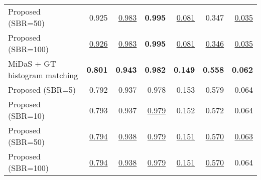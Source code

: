 \begin{tabular}{lrrr|rrr}
Proposed (SBR=50)                  &               0.925 &   \underline{0.983} &      \textbf{0.995} &  \underline{0.081} &              0.347 &  \underline{0.035} \\
Proposed (SBR=100)                 &   \underline{0.926} &   \underline{0.983} &      \textbf{0.995} &  \underline{0.081} &  \underline{0.346} &  \underline{0.035} \\
\midrule
MiDaS + GT histogram matching      &      \textbf{0.801} &      \textbf{0.943} &      \textbf{0.982} &     \textbf{0.149} &     \textbf{0.558} &     \textbf{0.062} \\
Proposed (SBR=5)                   &               0.792 &               0.937 &               0.978 &              0.153 &              0.579 &              0.064 \\
Proposed (SBR=10)                  &               0.793 &               0.937 &   \underline{0.979} &              0.152 &              0.572 &              0.064 \\
Proposed (SBR=50)                  &   \underline{0.794} &   \underline{0.938} &   \underline{0.979} &  \underline{0.151} &  \underline{0.570} &  \underline{0.063} \\
Proposed (SBR=100)                 &   \underline{0.794} &   \underline{0.938} &   \underline{0.979} &  \underline{0.151} &  \underline{0.570} &              0.064 \\
\bottomrule
\end{tabular}